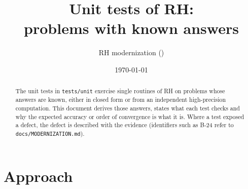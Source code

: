 \documentclass[11pt,a4paper]{article}
\title{Unit tests of RH:\\ problems with known answers}
\author{RH modernization (\code{tests/unit})}
\date{\today}
\newcommand{\code}[1]{\texttt{#1}}
\begin{document}
\maketitle

\begin{abstract}
The unit tests in \code{tests/unit} exercise single routines of RH on
problems whose answers are known, either in closed form or from an
independent high-precision computation. This document derives those
answers, states what each test checks and why the expected accuracy or
order of convergence is what it is. Where a test exposed a defect, the
defect is described with the evidence (identifiers such as B-24 refer to
\code{docs/MODERNIZATION.md}).
\end{abstract}

\tableofcontents

\section{Approach}
\end{document}
